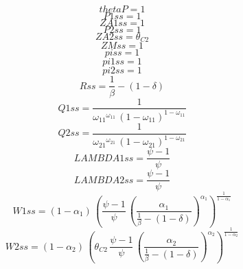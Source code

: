 \begin{dmath*}
thetaP = 1
\end{dmath*}
\begin{dmath*}
P1ss = 1
\end{dmath*}
\begin{dmath*}
ZA1ss = 1
\end{dmath*}
\begin{dmath*}
P2ss = 1
\end{dmath*}
\begin{dmath*}
ZA2ss = {{\theta_{C2}}}
\end{dmath*}
\begin{dmath*}
ZMss = 1
\end{dmath*}
\begin{dmath*}
piss = 1
\end{dmath*}
\begin{dmath*}
pi1ss = 1
\end{dmath*}
\begin{dmath*}
pi2ss = 1
\end{dmath*}
\begin{dmath*}
Rss = \frac{1}{{{\beta}}}-\left(1-{{\delta}}\right)
\end{dmath*}
\begin{dmath*}
Q1ss = \frac{1}{{{\omega_{11}}}^{{{\omega_{11}}}}\, \left(1-{{\omega_{11}}}\right)^{1-{{\omega_{11}}}}}
\end{dmath*}
\begin{dmath*}
Q2ss = \frac{1}{{{\omega_{21}}}^{{{\omega_{21}}}}\, \left(1-{{\omega_{21}}}\right)^{1-{{\omega_{21}}}}}
\end{dmath*}
\begin{dmath*}
LAMBDA1ss = \frac{{{\psi}}-1}{{{\psi}}}
\end{dmath*}
\begin{dmath*}
LAMBDA2ss = \frac{{{\psi}}-1}{{{\psi}}}
\end{dmath*}
\begin{dmath*}
W1ss = \left(1-{{\alpha_{1}}}\right)\, \left(\frac{{{\psi}}-1}{{{\psi}}}\, \left(\frac{{{\alpha_{1}}}}{\frac{1}{{{\beta}}}-\left(1-{{\delta}}\right)}\right)^{{{\alpha_{1}}}}\right)^{\frac{1}{1-{{\alpha_{1}}}}}
\end{dmath*}
\begin{dmath*}
W2ss = \left(1-{{\alpha_{2}}}\right)\, \left({{\theta_{C2}}}\, \frac{{{\psi}}-1}{{{\psi}}}\, \left(\frac{{{\alpha_{2}}}}{\frac{1}{{{\beta}}}-\left(1-{{\delta}}\right)}\right)^{{{\alpha_{2}}}}\right)^{\frac{1}{1-{{\alpha_{2}}}}}
\end{dmath*}
